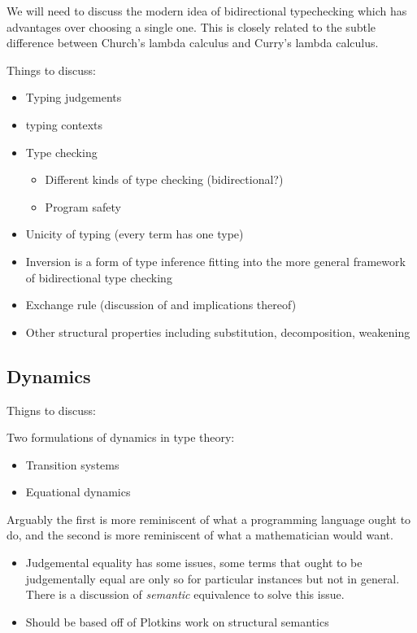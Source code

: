We will need to discuss the modern idea of bidirectional typechecking which has advantages over choosing a single one. This is closely related to the subtle difference between Church's lambda calculus and Curry's lambda calculus.


Things to discuss:

\begin{itemize}
    \item Typing judgements
    \item typing contexts
    \item Type checking
    \begin{itemize}
        \item Different kinds of type checking (bidirectional?)
        \item Program safety
    \end{itemize}
    \item Unicity of typing (every term has one type)
    \item Inversion is a form of type inference fitting into the more general framework of bidirectional type checking
    \item Exchange rule (discussion of and implications thereof)
    \item Other structural properties including substitution, decomposition, weakening
\end{itemize}

\subsection{Dynamics}

Thigns to discuss:

\item Two formulations of dynamics in type theory:
\begin{itemize}
    \item Transition systems
    \item Equational dynamics
\end{itemize}

Arguably the first is more reminiscent of what a programming language ought to do, and the second is more reminiscent of what a mathematician would want.

\begin{itemize}
    \item Judgemental equality has some issues, some terms that ought to be judgementally equal are only so for particular instances but not in general. There is a discussion of \emph{semantic} equivalence to solve this issue.
    \item Should be based off of Plotkins work on structural semantics
\end{itemize}

